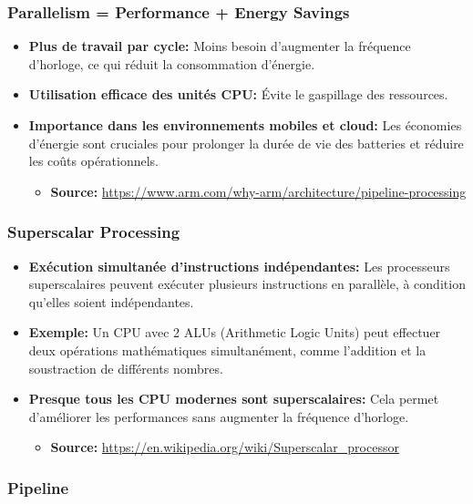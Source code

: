 \documentclass[10pt,a4paper]{article}
\begin{document}
\subsubsection*{Parallelism = Performance + Energy Savings}

\begin{itemize}
    \item \textbf{Plus de travail par cycle:} Moins besoin d'augmenter la fréquence d'horloge, ce qui réduit la consommation d'énergie.
    \item \textbf{Utilisation efficace des unités CPU:} Évite le gaspillage des ressources.
    \item \textbf{Importance dans les environnements mobiles et cloud:} Les économies d'énergie sont cruciales pour prolonger la durée de vie des batteries et réduire les coûts opérationnels.
    \begin{itemize}
        \item \textbf{Source:} \url{https://www.arm.com/why-arm/architecture/pipeline-processing}
    \end{itemize}
\end{itemize}

\subsubsection*{Superscalar Processing}

\begin{itemize}
    \item \textbf{Exécution simultanée d'instructions indépendantes:} Les processeurs superscalaires peuvent exécuter plusieurs instructions en parallèle, à condition qu'elles soient indépendantes.
    \item \textbf{Exemple:} Un CPU avec 2 ALUs (Arithmetic Logic Units) peut effectuer deux opérations mathématiques simultanément, comme l'addition et la soustraction de différents nombres.
    \item \textbf{Presque tous les CPU modernes sont superscalaires:} Cela permet d'améliorer les performances sans augmenter la fréquence d'horloge.
    \begin{itemize}
        \item \textbf{Source:} \url{https://en.wikipedia.org/wiki/Superscalar_processor}
    \end{itemize}
\end{itemize}

\subsubsection*{Pipeline}
\end{document}
